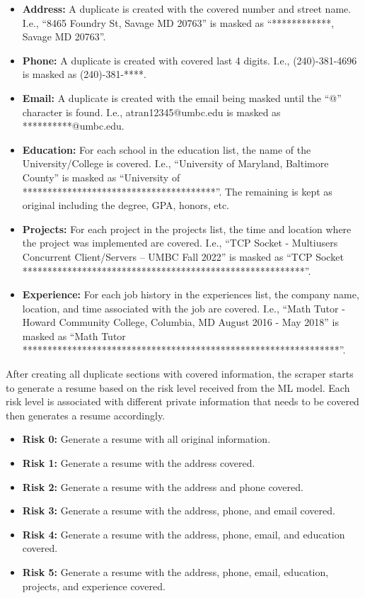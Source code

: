 \documentclass{article}
\begin{document}
\begin{itemize}
  \item \textbf{Address:} A duplicate is created with the covered number and street name. I.e., “8465 Foundry St, Savage MD 20763” is masked as “************, Savage MD 20763”.
  \item \textbf{Phone:} A duplicate is created with covered last 4 digits. I.e., (240)-381-4696 is masked as (240)-381-****.
  \item \textbf{Email:} A duplicate is created with the email being masked until the “@” character is found. I.e., atran12345@umbc.edu is masked as **********@umbc.edu.
  \item \textbf{Education:} For each school in the education list, the name of the University/College is covered. I.e., “University of Maryland, Baltimore County” is masked as “University of ***************************************”. The remaining is kept as original including the degree, GPA, honors, etc.
  \item \textbf{Projects:} For each project in the projects list, the time and location where the project was implemented are covered. I.e., “TCP Socket - Multiusers Concurrent Client/Servers – UMBC	Fall 2022” is masked as “TCP Socket *********************************************************”.
  \item \textbf{Experience:} For each job history in the experiences list, the company name, location, and time associated with the job are covered. I.e., “Math Tutor - Howard Community College, Columbia, MD	August 2016 - May 2018” is masked as “Math Tutor ****************************************************************”.
\end{itemize}


After creating all duplicate sections with covered information, the scraper starts to generate a resume based on the risk level received from the ML model. Each risk level is associated with different private information that needs to be covered then generates a resume accordingly.
\begin{itemize}
  \item \textbf{Risk 0:} Generate a resume with all original information.
  \item \textbf{Risk 1:} Generate a resume with the address covered.
  \item \textbf{Risk 2:} Generate a resume with the address and phone covered.
  \item \textbf{Risk 3:} Generate a resume with the address, phone, and email covered.
  \item \textbf{Risk 4:} Generate a resume with the address, phone, email, and education covered.
  \item \textbf{Risk 5:} Generate a resume with the address, phone, email, education, projects, and experience covered.
\end{itemize}
\end{document}
